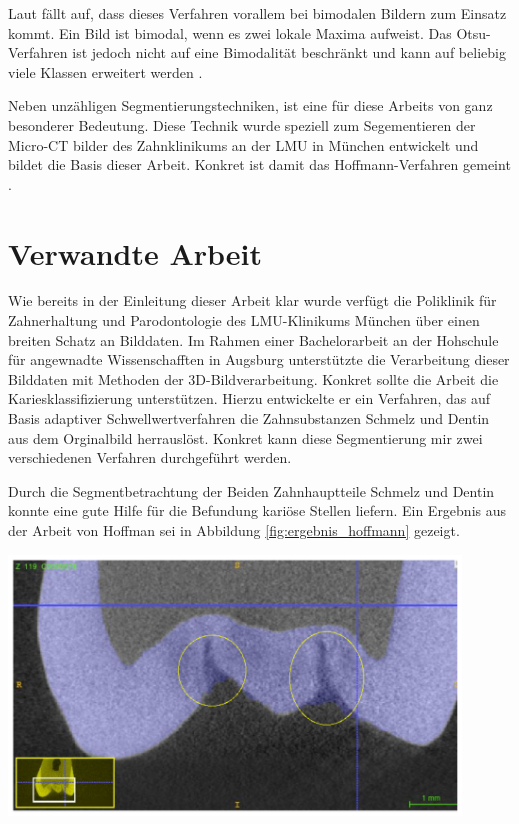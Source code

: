 Laut \citet[Seite264]{lehmann2013bildverarbeitung} fällt auf, dass dieses
Verfahren vorallem bei bimodalen Bildern zum Einsatz kommt. Ein Bild ist bimodal,
wenn es zwei lokale Maxima aufweist. Das Otsu-Verfahren ist jedoch nicht auf eine
Bimodalität beschränkt und kann auf beliebig viele Klassen erweitert werden \citep[vgl.][Seite264]{lehmann2013bildverarbeitung}.

Neben unzähligen Segmentierungstechniken, ist eine für diese Arbeits von ganz
besonderer Bedeutung. Diese Technik wurde speziell zum Segementieren der Micro-CT
bilder des Zahnklinikums an der LMU in München entwickelt und bildet die Basis dieser
Arbeit. Konkret ist damit das Hoffmann-Verfahren gemeint \citep[vgl.][]{hoffmann2020}.

\section{Verwandte Arbeit}
\label{sec:verwwandte_arbeit} Wie bereits in der Einleitung dieser Arbeit klar wurde
verfügt die Poliklinik für Zahnerhaltung und Parodontologie des LMU-Klinikums München
über einen breiten Schatz an Bilddaten. Im Rahmen einer Bachelorarbeit an der
Hohschule für angewnadte Wissenschafften in Augsburg unterstützte \citet{hoffmann2020}
die Verarbeitung dieser Bilddaten mit Methoden der 3D-Bildverarbeitung. Konkret
sollte die Arbeit die Kariesklassifizierung unterstützen. Hierzu entwickelte er ein
Verfahren, das auf Basis adaptiver Schwellwertverfahren die Zahnsubstanzen
Schmelz und Dentin aus dem Orginalbild herrauslöst. Konkret kann diese Segmentierung
mir zwei verschiedenen Verfahren durchgeführt werden.

\begin{minipage}{0.30\textwidth}
	Durch die Segmentbetrachtung der Beiden Zahnhauptteile Schmelz und Dentin konnte
	\citet{hoffmann2020} eine gute Hilfe für die Befundung kariöse Stellen liefern.
	Ein Ergebnis aus der Arbeit von Hoffman sei in Abbildung \ref{fig:ergebnis_hoffmann}
	gezeigt.
\end{minipage}
\hfill
\begin{minipage}{0.60\textwidth}
	\centering
	\includegraphics[width=0.9\textwidth]{img/ergebnis_hoffmann.jpg}
	\label{fig:ergebnis_hoffmann}
\end{minipage}

